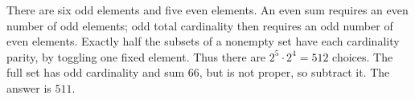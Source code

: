 There are six odd elements and five even elements. An even sum requires an even number of odd elements; odd total cardinality then requires an odd number of even elements. Exactly half the subsets of a nonempty set have each cardinality parity, by toggling one fixed element. Thus there are $2^5\cdot2^4=512$ choices. The full set has odd cardinality and sum $66$, but is not proper, so subtract it. The answer is $\boxed{511}$.
